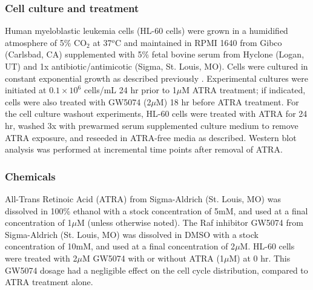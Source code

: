 \documentclass[10pt,twocolumn,twoside,final]{IEEEtran}
\begin{document}
\subsubsection*{Cell culture and treatment}
Human myeloblastic leukemia cells (HL-60 cells) were grown in a humidified atmosphere of 5\% CO$_2$ at 37$^{o}$C and maintained in RPMI 1640 from Gibco (Carlsbad, CA)
supplemented with 5\% fetal bovine serum from Hyclone (Logan, UT) and 1x antibiotic/antimicotic (Sigma, St. Louis, MO).
Cells were cultured in constant exponential growth as described previously \cite{Brooks1996}.
Experimental cultures were initiated at $0.1\times10^6$ cells/mL 24 hr prior to 1$\mu$M ATRA treatment;
if indicated, cells were also treated with GW5074 (2$\mu$M) 18 hr before ATRA treatment.
For the cell culture washout experiments, HL-60 cells were treated with ATRA for 24 hr,
washed 3x with prewarmed serum supplemented culture medium to remove ATRA exposure,
and reseeded in ATRA-free media as described.
Western blot analysis was performed at incremental time points after removal of ATRA.

\subsubsection*{Chemicals}
All-Trans Retinoic Acid (ATRA) from Sigma-Aldrich (St. Louis, MO) was dissolved in
100\% ethanol with a stock concentration of 5mM, and used at a final concentration of 1$\mu$M (unless otherwise noted).
The Raf inhibitor GW5074 from Sigma-Aldrich (St. Louis, MO) was dissolved in DMSO with a stock concentration of 10mM,
and used at a final concentration of 2$\mu$M.
HL-60 cells were treated with 2$\mu$M GW5074 with or without ATRA (1$\mu$M) at 0 hr.
This GW5074 dosage had a negligible effect on the cell cycle distribution, compared to ATRA treatment alone.
\end{document}
